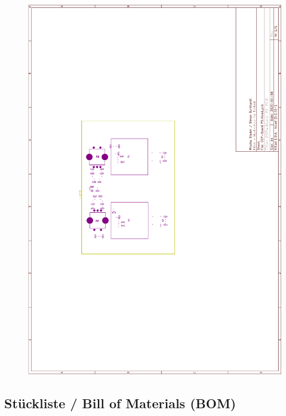 \begin{appendix}
\begin{figure}[h]
	\centering
	\includegraphics[width=0.95\linewidth]{appendix/DSP-Board-PCB-V1-1(4).pdf}
\end{figure}
\clearpage

\subsection{Stückliste / Bill of Materials (BOM)}
\label{app:BOM}


\end{appendix}
